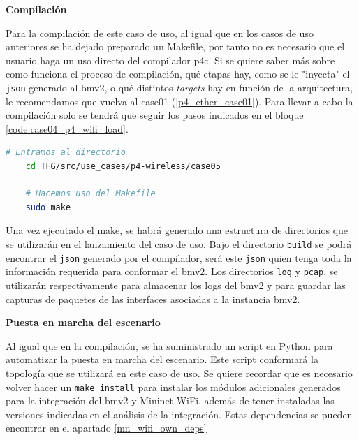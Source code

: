 \newpage

\vspace{0.2cm}
\textbf{Compilación}\\
\par

Para la compilación de este caso de uso, al igual que en los casos de uso anteriores se ha dejado preparado un Makefile, por tanto no es necesario que el usuario haga un uso directo del compilador p4c. Si se quiere saber más sobre como funciona el proceso de compilación, qué etapas hay, como se le "inyecta" el \texttt{json} generado al \gls{bmv2}, o qué distintos \textit{targets} hay en función de la arquitectura, le recomendamos que vuelva al case01 (\ref{p4_ether_case01}). Para llevar a cabo la compilación solo se tendrá que seguir los pasos indicados en el bloque \ref{code:case04_p4_wifi_load}.

\begin{lstlisting}[language= bash, style=Consola, caption={Compilación programa P4  - Case05},label=code:case05_p4_wifi_load]
    # Entramos al directorio 
    cd TFG/src/use_cases/p4-wireless/case05

    # Hacemos uso del Makefile
    sudo make
\end{lstlisting}
\vspace{0.5cm}


Una vez ejecutado el make, se habrá generado una estructura de directorios que se utilizarán en el lanzamiento del caso de uso. Bajo el directorio \texttt{build} se podrá encontrar el \texttt{json} generado por el compilador, será este \texttt{json} quien tenga toda la información requerida para conformar el \gls{bmv2}. Los directorios \texttt{log} y \texttt{pcap}, se utilizarán respectivamente para almacenar los logs del \gls{bmv2} y para guardar las capturas de paquetes de las interfaces asociadas a la instancia \gls{bmv2}.\\
\par



\vspace{0.2cm}
\textbf{Puesta en marcha del escenario}\\
\par

Al igual que en la compilación, se ha suministrado un script en Python para automatizar la puesta en marcha del escenario. Este script conformará la topología que se utilizará en este caso de uso. Se quiere recordar que es necesario volver hacer un \texttt{make install} para instalar los módulos adicionales generados para la integración del \gls{bmv2} y Mininet-WiFi, además de tener instaladas las versiones indicadas en el análisis de la integración. Estas dependencias se pueden encontrar en el apartado \ref{mn_wifi_own_deps} \\
\par

